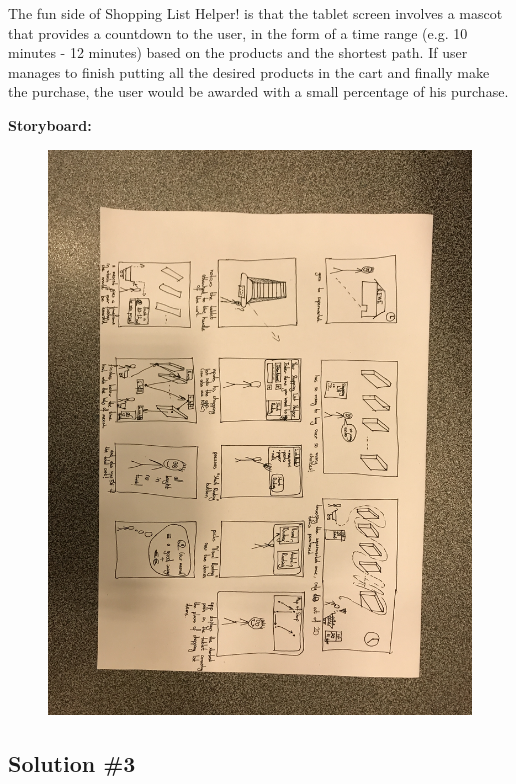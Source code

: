 \documentclass[a4paper,10pt,oneside]{scrreprt}
\begin{document}
			The fun side of Shopping List Helper! is that the tablet screen involves a mascot that provides a countdown to the user, in the form of a time range (e.g. 10 minutes - 12 minutes) based on the products and the shortest path. If user manages to finish putting all the desired products in the cart and finally make the purchase, the user would be awarded with a small percentage of his purchase.

			\noindent \textbf{Storyboard:}\\

			\begin{figure}[h]
				\centering
				\includegraphics[scale=0.16, clip, trim={71em 35em 33em 43em}]{images/s2.jpg}
			\end{figure}

		\clearpage

		\subsection{Solution \#3}
\end{document}
